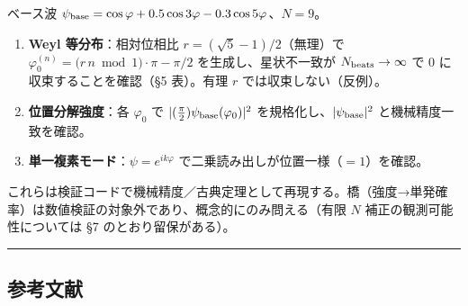 \documentclass[
]{ltjsarticle}
\providecommand{\tightlist}{%
  \setlength{\itemsep}{0pt}\setlength{\parskip}{0pt}}
\begin{document}
ベース波
\(\psi_{\rm base}=\cos\varphi+0.5\cos3\varphi-0.3\cos5\varphi\)、\(N=9\)。

\begin{enumerate}
\def\labelenumi{\arabic{enumi}.}
\tightlist
\item
  \textbf{Weyl 等分布}：相対位相比 \(r=(\sqrt5-1)/2\)（無理）で
  \(\varphi_0^{(n)}=\big(r\,n \bmod 1\big)\cdot\pi-\pi/2\)
  を生成し、星状不一致が \(N_{\rm beats}\to\infty\) で \(0\)
  に収束することを確認（§5 表）。有理 \(r\) では収束しない（反例）。
\item
  \textbf{位置分解強度}：各 \(\varphi_0\) で
  \(|(\tfrac{\pi}{2})\psi_{\rm base}(\varphi_0)|^2\)
  を規格化し、\(|\psi_{\rm base}|^2\) と機械精度一致を確認。
\item
  \textbf{単一複素モード}：\(\psi=e^{ik\varphi}\)
  で二乗読み出しが位置一様（\(=1\)）を確認。
\end{enumerate}

これらは検証コードで機械精度／古典定理として再現する。橋（強度→単発確率）は数値検証の対象外であり、概念的にのみ問える（有限
\(N\) 補正の観測可能性については §7 のとおり留保がある）。

\begin{center}\rule{0.5\linewidth}{0.5pt}\end{center}

\subsection{参考文献}\label{ux53c2ux8003ux6587ux732e}
\end{document}
